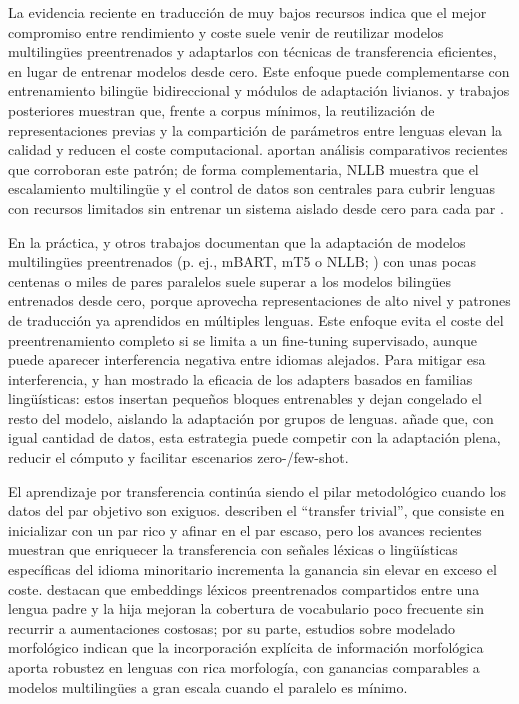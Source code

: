 \documentclass[12pt,a4paper,oneside]{book}
\begin{document}
La evidencia reciente en traducción de muy bajos recursos indica que el mejor compromiso entre rendimiento y coste suele venir de reutilizar modelos multilingües preentrenados y adaptarlos con técnicas de transferencia eficientes, en lugar de entrenar modelos desde cero. Este enfoque puede complementarse con entrenamiento bilingüe bidireccional y módulos de adaptación livianos. \textcite{liu2020mbart} y trabajos posteriores muestran que, frente a corpus mínimos, la reutilización de representaciones previas y la compartición de parámetros entre lenguas elevan la calidad y reducen el coste computacional. \textcite{desilva2024} aportan análisis comparativos recientes que corroboran este patrón; de forma complementaria, NLLB muestra que el escalamiento multilingüe y el control de datos son centrales para cubrir lenguas con recursos limitados sin entrenar un sistema aislado desde cero para cada par \parencite{nllb2022}.

En la práctica, \textcite{nllb2022} y otros trabajos documentan que la adaptación de modelos multilingües preentrenados (p. ej., mBART, mT5 o NLLB; \cite{liu2020mbart,xue2021mt5}) con unas pocas centenas o miles de pares paralelos suele superar a los modelos bilingües entrenados desde cero, porque aprovecha representaciones de alto nivel y patrones de traducción ya aprendidos en múltiples lenguas. Este enfoque evita el coste del preentrenamiento completo si se limita a un fine-tuning supervisado, aunque puede aparecer interferencia negativa entre idiomas alejados. Para mitigar esa interferencia, \textcite{chronopoulou2023} y \textcite{houlsby2019} han mostrado la eficacia de los adapters basados en familias lingüísticas: estos insertan pequeños bloques entrenables y dejan congelado el resto del modelo, aislando la adaptación por grupos de lenguas. \textcite{hu2022lora} añade que, con igual cantidad de datos, esta estrategia puede competir con la adaptación plena, reducir el cómputo y facilitar escenarios zero-/few-shot.

El aprendizaje por transferencia continúa siendo el pilar metodológico cuando los datos del par objetivo son exiguos. \textcite{kocmi2018} describen el ``transfer trivial'', que consiste en inicializar con un par rico y afinar en el par escaso, pero los avances recientes muestran que enriquecer la transferencia con señales léxicas o lingüísticas específicas del idioma minoritario incrementa la ganancia sin elevar en exceso el coste. \textcite{maimaiti2022} destacan que embeddings léxicos preentrenados compartidos entre una lengua padre y la hija mejoran la cobertura de vocabulario poco frecuente sin recurrir a aumentaciones costosas; por su parte, estudios sobre modelado morfológico \parencite{nzeyimana2024} indican que la incorporación explícita de información morfológica aporta robustez en lenguas con rica morfología, con ganancias comparables a modelos multilingües a gran escala cuando el paralelo es mínimo.
\end{document}

